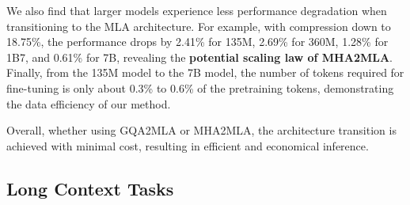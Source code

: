 



We also find that larger models experience less performance degradation when transitioning to the MLA architecture. For example, with compression down to 18.75\%, the performance drops by 2.41\% for 135M, 2.69\% for 360M, 1.28\% for 1B7, and 0.61\% for 7B, revealing the \textbf{potential scaling law of MHA2MLA}.
Finally, from the 135M model to the 7B model, the number of tokens required for fine-tuning is only about 0.3\% to 0.6\% of the pretraining tokens, demonstrating the data efficiency of our method.

Overall, whether using GQA2MLA or MHA2MLA, the architecture transition is achieved with minimal cost, resulting in efficient and economical inference.



\subsection{Long Context Tasks}

% 
\label{ssec:longbench_res}

